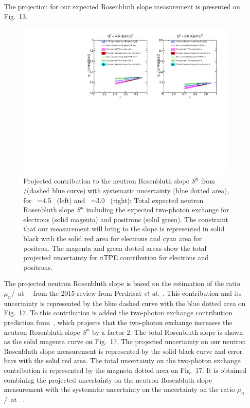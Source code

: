 The projection for our expected Rosenbluth slope measurement is presented on Fig.~13. %
%
\begin{figure}[!h]
  \centering
    \includegraphics[width=15cm]{Plots/NTPEplus_Proj.pdf}%
    \caption{Projected contribution to the neutron Rosenbluth slope $S^n$ from \gen/\gmn (dashed blue curve) with systematic uncertainty (blue dotted area), for \qsq~=4.5 \gevcsq~(left) and \qsq~=3.0 \gevcsq~(right);
      Total expected neutron Rosenbluth slope $S^n$ including the expected two-photon exchange for electrons (solid magenta) and positrons (solid green).
      The constraint that our measurement will bring to the slope is represented in solid black with the solid red area for electrons and cyan area for positron.
      The magenta and green dotted areas show the total projected uncertainty for nTPE contribution for electrons and positrons.}
    \label{fig:proj_results}
\end{figure}
%
The projected neutron Rosenbluth slope is based on the estimation of the ratio $\mu_n$\gen/\gmn~at ~\gevcsq~from the 2015 review from Perdrisat {\it et al.}~\cite{Punjabi:2015bba}. This contribution and its uncertainty is represented by the blue dashed curve with the blue dotted area on Fig.~17.%
To this contribution is added the two-photon exchange contribution prediction from~\cite{Blunden:2005ew}, which projects that the two-photon exchange increases the  neutron Rosenbluth slope $S^n$ by a factor 2.
The total Rosenbluth slope is shown as the solid magenta curve on Fig.~17.%
The projected uncertainty on our neutron Rosenbluth slope measurement is represented by the solid black curve and error bars with the solid red area.
The total uncertainty on the two-photon exchange contribution is represented by the magneta dotted area on Fig.~17.%
It is obtained combining the projected uncertainty on the neutron Rosenbluth slope measurement with the systematic uncertainty on the uncertainty on the ratio $\mu_n$\gen/\gmn~at ~\gevcsq.
